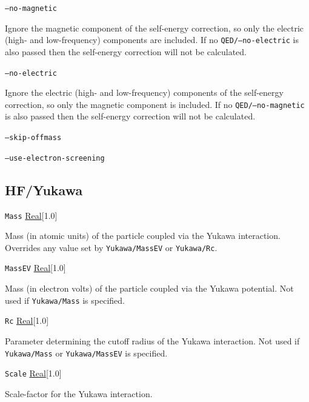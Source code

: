 \documentclass{report}
\begin{document}
\texttt{--no-magnetic}
\begin{adjustwidth}{1cm}{}
Ignore the magnetic component of the self-energy correction, so only the electric (high- and
low-frequency) components are included. If no \texttt{QED/--no-electric} is also passed then the self-energy
correction will not be calculated.
\end{adjustwidth}

\texttt{--no-electric}
\begin{adjustwidth}{1cm}{}
Ignore the electric (high- and low-frequency) components of the self-energy correction, so only the
magnetic component is included. If no \texttt{QED/--no-magnetic} is also passed then the self-energy
correction will not be calculated.
\end{adjustwidth}

\texttt{--skip-offmass}
\begin{adjustwidth}{1cm}{}
\end{adjustwidth}

\texttt{--use-electron-screening}

\subsection{HF/Yukawa}
\texttt{Mass} \uline{Real}[1.0]
\begin{adjustwidth}{1cm}{}
Mass (in atomic units) of the particle coupled via the Yukawa interaction. Overrides any value set by
\texttt{Yukawa/MassEV} or \texttt{Yukawa/Rc}.
\end{adjustwidth}

\texttt{MassEV} \uline{Real}[1.0]
\begin{adjustwidth}{1cm}{}
Mass (in electron volts) of the particle coupled via the Yukawa potential. Not used if
\texttt{Yukawa/Mass} is specified.
\end{adjustwidth}

\texttt{Rc} \uline{Real}[1.0]
\begin{adjustwidth}{1cm}{}
Parameter determining the cutoff radius of the Yukawa interaction. Not used if \texttt{Yukawa/Mass}
or \texttt{Yukawa/MassEV} is specified.
\end{adjustwidth}

\texttt{Scale} \uline{Real}[1.0]
\begin{adjustwidth}{1cm}{}
Scale-factor for the Yukawa interaction.
\end{adjustwidth}
\end{document}
